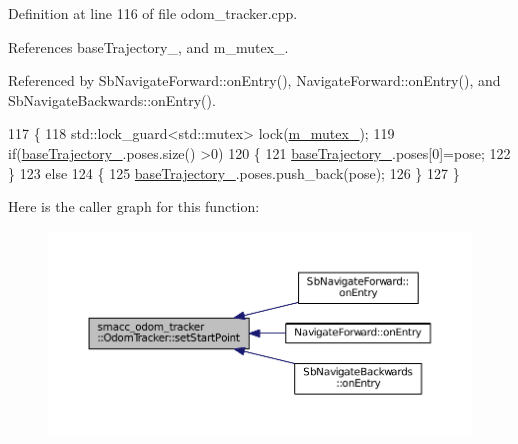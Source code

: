 Definition at line 116 of file odom\+\_\+tracker.\+cpp.



References base\+Trajectory\+\_\+, and m\+\_\+mutex\+\_\+.



Referenced by Sb\+Navigate\+Forward\+::on\+Entry(), Navigate\+Forward\+::on\+Entry(), and Sb\+Navigate\+Backwards\+::on\+Entry().


\begin{DoxyCode}
117 \{
118     std::lock\_guard<std::mutex> lock(\hyperlink{classsmacc__odom__tracker_1_1OdomTracker_ad65e52bfd236e073940808c35f2bed8c}{m\_mutex\_});
119     \textcolor{keywordflow}{if}(\hyperlink{classsmacc__odom__tracker_1_1OdomTracker_ac3a17be46ab833632c5f63e75c840dc7}{baseTrajectory\_}.poses.size() >0)
120     \{
121         \hyperlink{classsmacc__odom__tracker_1_1OdomTracker_ac3a17be46ab833632c5f63e75c840dc7}{baseTrajectory\_}.poses[0]=pose;
122     \}
123     \textcolor{keywordflow}{else}
124     \{
125         \hyperlink{classsmacc__odom__tracker_1_1OdomTracker_ac3a17be46ab833632c5f63e75c840dc7}{baseTrajectory\_}.poses.push\_back(pose);
126     \}
127 \}
\end{DoxyCode}


Here is the caller graph for this function\+:
\nopagebreak
\begin{figure}[H]
\begin{center}
\leavevmode
\includegraphics[width=350pt]{classsmacc__odom__tracker_1_1OdomTracker_a5ac7c4770b3e29b74571ef65377048ee_icgraph}
\end{center}
\end{figure}


